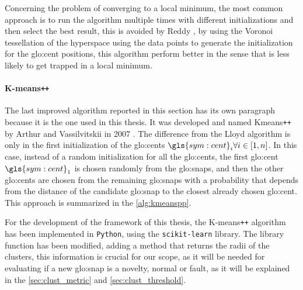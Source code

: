 Concerning the problem of converging to a local minimum, the most common approach is to run the algorithm multiple times with different initializations and then select the best result, this is avoided by Reddy \cite{Vornoi_Kmeans}, by using the Voronoi tessellation of the hyperspace using the data points to generate the initialization for the {\gls{glo:cent}} positions, this algorithm perform better in the sense that is less likely to get trapped in a local minimum.


\paragraph{K-means\texttt{++}} 
The last improved algorithm reported in this section has its own paragraph because it is the one used in this thesis. It was developed and named Kmeans\texttt{++} by Arthur and Vassilvitskii in 2007 \cite{Kmeanspp}. The difference from the Lloyd algorithm is only in the first initialization of the {\gls{glo:cent}}s $\gls{sym:cent}_i \forall i \in [1,n]$. In this case, instead of a random initialization for all the {\gls{glo:cent}}s, the first {\gls{glo:cent}} $\gls{sym:cent}_1$ is chosen randomly from the {\gls{glo:snap}}s, and then the other {\gls{glo:cent}}s are chosen from the remaining {\gls{glo:snap}}s with a probability that depends from the distance of the candidate {\gls{glo:snap}} to the closest already chosen {\gls{glo:cent}}. This approach is summarized in the \autoref{alg:kmeanspp}.

For the development of the framework of this thesis, the K-means\texttt{++} algorithm has been implemented in \texttt{Python}, using the \texttt{scikit-learn} library. The library function has been modified, adding a method that returns the radii of the clusters, this information is crucial for our scope, as it will be needed for evaluating if a new {\gls{glo:snap}} is a novelty, normal or fault, as it will be explained in the \autoref{sec:clust_metric} and \autoref{sec:clust_threshold}.

